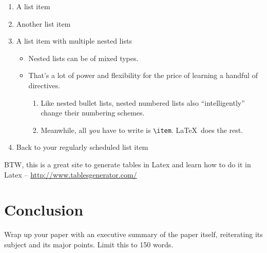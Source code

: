 \documentclass{article}
\begin{document}
\begin{enumerate}
\item A list item
\item Another list item
\item A list item with multiple nested lists

\begin{itemize}
\item Nested lists can be of mixed types.
\item That's a lot of power and flexibility for the price of learning a handful of directives.

\begin{enumerate}
\item Like nested bullet lists, nested numbered lists also ``intelligently'' change their numbering schemes.
\item Meanwhile, all \emph{you} have to write is \verb!\item!.  \LaTeX\ does the rest.
\end{enumerate}
\end{itemize}

\item Back to your regularly scheduled list item

\end{enumerate}

BTW, this is a great site to generate tables in Latex and learn how to do it in Latex -- \url{http://www.tablesgenerator.com/}


\section{Conclusion}

Wrap up your paper with an executive summary of the paper itself, reiterating its subject and its major points. Limit this to 150 words.
\end{document}
